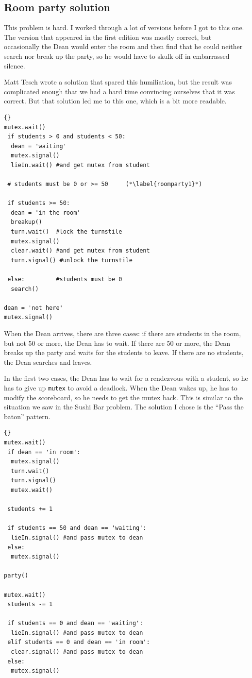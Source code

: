 \documentclass{book}
\begin{document}
\subsection {Room party solution}

This problem is hard.  I worked through a lot of versions before
I got to this one.  The version that appeared in the first edition
was mostly correct, but occasionally the Dean would enter the
room and then find that he could neither search nor break up the
party, so he would have to skulk off in embarrassed silence.

Matt Tesch wrote a solution that spared this humiliation, but the
result was complicated enough that we had a hard time convincing
ourselves that it was correct.  But that solution led me to this one,
which is a bit more readable.

\newpage
\begin{lstlisting}[title={Room party solution (dean)}]{}
mutex.wait()
 if students > 0 and students < 50:
  dean = 'waiting'
  mutex.signal()
  lieIn.wait() #and get mutex from student

 # students must be 0 or >= 50     (*\label{roomparty1}*)

 if students >= 50:
  dean = 'in the room'
  breakup()
  turn.wait()  #lock the turnstile
  mutex.signal()
  clear.wait() #and get mutex from student
  turn.signal() #unlock the turnstile

 else:         #students must be 0
  search()

dean = 'not here'
mutex.signal() 
\end{lstlisting}

When the Dean arrives, there are three cases: if there are students in
the room, but not 50 or more, the Dean has to wait.  If there are 50
or more, the Dean breaks up the party and waits for the students to
leave.  If there are no students, the Dean searches and leaves.

In the first two cases, the Dean has to wait for a rendezvous with a
student, so he has to give up {\tt mutex} to avoid a deadlock.  When
the Dean wakes up, he has to modify the scoreboard, so he needs to get
the mutex back.  This is similar to the situation we saw in the Sushi
Bar problem.  The solution I chose is the ``Pass the baton'' pattern.

\newpage
\begin{lstlisting}[title={Room party solution (student)}]{}
mutex.wait()
 if dean == 'in room':
  mutex.signal()
  turn.wait()
  turn.signal()
  mutex.wait()

 students += 1

 if students == 50 and dean == 'waiting':
  lieIn.signal() #and pass mutex to dean
 else:
  mutex.signal()

party()

mutex.wait()
 students -= 1

 if students == 0 and dean == 'waiting':
  lieIn.signal() #and pass mutex to dean
 elif students == 0 and dean == 'in room':
  clear.signal() #and pass mutex to dean
 else:
  mutex.signal()
\end{lstlisting}
\end{document}
